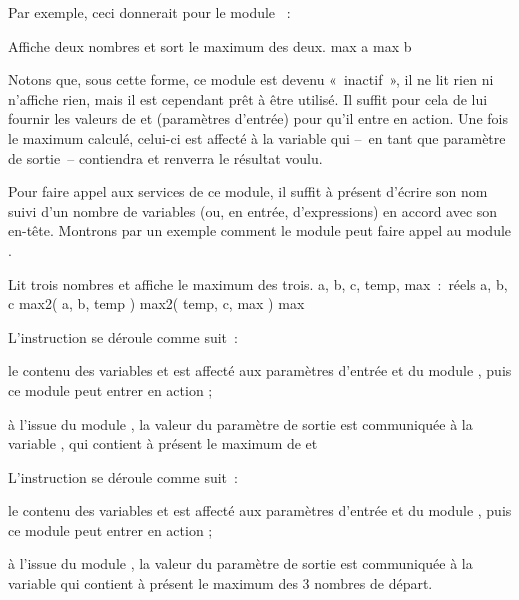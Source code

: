	Par exemple, ceci donnerait pour le module ~:

	\begin{Pseudocode}
		\RComment Affiche deux nombres et sort le maximum des deux.
			\Let max \Gets a
		\Else
			\Let max \Gets b
		\EndIf
	\EndModule
	\end{Pseudocode}

	Notons que, sous cette forme, ce module est devenu «~inactif~», il ne
	lit rien ni n’affiche rien, mais il est cependant prêt à être utilisé. Il
	suffit pour cela de lui fournir les valeurs de  et
	 (paramètres d’entrée) pour qu’il entre en action.
	Une fois le maximum calculé, celui-ci est affecté à la variable
	 qui –~en tant que paramètre de sortie~–
	contiendra et renverra le résultat voulu.

	Pour faire appel aux services de ce module, 
	il suffit à présent d’écrire son nom suivi d’un nombre de variables 
	(ou, en entrée, d’expressions) en accord avec son en-tête. 
	Montrons par un exemple comment le module \pseudocode{max3}
	peut faire appel au module \pseudocode{max2}.

	\begin{Pseudocode}
	\Module{max3}{}{}
		\RComment Lit trois nombres et affiche le maximum des trois.
		\Decl a, b, c, temp, max~:~réels
		\Read a, b, c
		\Stmt max2( a, b, temp )
		\Stmt max2( temp, c, max )
		\Write max
	\EndModule
	\end{Pseudocode}

	L’instruction  se déroule comme suit~:
	
	\begin{liste}
	\item
		le contenu des variables  et \pseudocode{b}
		est affecté aux paramètres d’entrée
		 et \pseudocode{b}
		du module ,
		puis ce module peut entrer en action ;
	\item
		à l’issue du module \pseudocode{max2},
		la valeur du paramètre de sortie
		 est communiquée à la variable
		\pseudocode{temp},
		qui contient à présent le maximum de
		 et 
	\end{liste}

	L’instruction  se déroule comme suit~:
	
	\begin{liste}
	\item
		le contenu des variables  et \pseudocode{c}
		est affecté aux paramètres d’entrée
		 et 
		du module ,
		puis ce module peut entrer en action ;
	\item
		à l’issue du module ,
		la valeur du paramètre de sortie
		 est communiquée à la variable
		\pseudocode{max}
		qui contient à présent le maximum des 3 nombres de départ.
	\end{liste}

